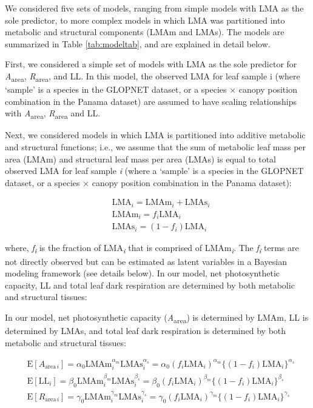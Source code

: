 \documentclass[
  12pt,
]{article}
\begin{document}
We considered five sets of models, ranging from simple models with LMA as the sole predictor, to more complex models in which LMA was partitioned into metabolic and structural components (LMAm and LMAs).
The models are summarized in Table \ref{tab:modeltab}, and are explained in detail below.

First, we considered a simple set of models with LMA as the sole predictor for \emph{A}\textsubscript{area}, \emph{R}\textsubscript{area}, and LL.
In this model, the observed LMA for leaf sample i (where `sample' is a species in the GLOPNET dataset, or a species \(\times\) canopy position combination in the Panama dataset) are assumed to have scaling relationships with \emph{A}\textsubscript{area}, \emph{R}\textsubscript{area} and LL.

Next, we considered models in which LMA is partitioned into additive metabolic and structural functions; i.e., we assume that the sum of metabolic leaf mass per area (LMAm) and structural leaf mass per area (LMAs) is equal to total observed LMA for leaf sample \emph{i} (where a `sample' is a species in the GLOPNET dataset, or a species × canopy position combination in the Panama dataset):

\begin{align}
  &\mathrm{LMA}_{i} =\mathrm{LMAm}_{i} + \mathrm{LMAs}_{i} \label{eq:LMA}\\
  &\mathrm{LMAm}_{i} = f_{i} \mathrm{LMA}_{i} \label{eq:LMAm}\\
  &\mathrm{LMAs}_{i} = (1 - f_{i})  \mathrm{LMA}_{i}\label{eq:LMAs}
\end{align}

where, \emph{f\textsubscript{i}} is the fraction of LMA\textsubscript{\emph{i}} that is comprised of LMAm\textsubscript{\emph{i}}.
The \emph{f\textsubscript{i}} terms are not directly observed but can be estimated as latent variables in a Bayesian modeling framework (see details below).
In our model, net photosynthetic capacity, LL and total leaf dark respiration are determined by both metabolic and structural tissues:

In our model, net photosynthetic capacity (\emph{A}\textsubscript{area}) is determined by LMAm, LL is determined by LMAs, and total leaf dark respiration is determined by both metabolic and structural tissues:

\begin{align}
& \mathrm{E}[A_{\mathrm{area} \, i}]
= \alpha_0\mathrm{LMAm}_{i}^{\alpha_m}\mathrm{LMAs}_i^{\alpha_s}  =  \alpha_0 (f_i \mathrm{LMA}_{i})^{\alpha_m} \bigl\{(1-f_i) \mathrm{LMA}_{i}\bigr\}^{\alpha_s} \label{eq:E-A} \\
& \mathrm{E}[\mathrm{LL}_i] = \beta_0\mathrm{LMAm}_{i}^{\beta_m} \mathrm{LMAs}_{i}^{\beta_s}   = \beta_0 (f_i \mathrm{LMA}_{i})^{\beta_m} \bigl\{(1-f_i) \mathrm{LMA}_{i}\bigr\}^{\beta_s} \label{eq:E-LL} \\
& \mathrm{E}[R_{\mathrm{area} \, i}]
= \gamma_0\mathrm{LMAm}_{i}^{\gamma_m} \mathrm{LMAs}_{i}^{\gamma_s}
= \gamma_0 (f_i \mathrm{LMA}_{i})^{\gamma_m} \bigl\{(1-f_i)\mathrm{LMA}_{i}\bigr\}^{\gamma_s} \label{eq:E-R}
\end{align}
\end{document}
